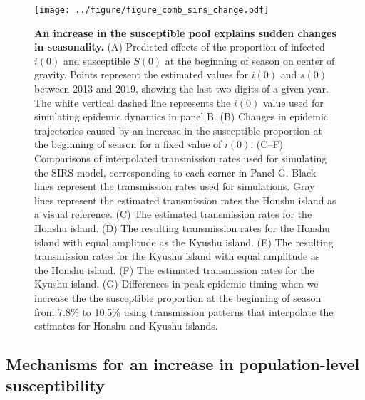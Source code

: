 \documentclass[12pt]{article}
\begin{document}
\begin{figure}[!th]
\begin{center}
\texttt{[image: ../figure/figure\_comb\_sirs\_change.pdf]}
\caption{
\textbf{An increase in the susceptible pool explains sudden changes in seasonality.}
(A) Predicted effects of the proportion of infected $i(0)$ and susceptible $S(0)$ at the beginning of season on center of gravity.
Points represent the estimated values for $i(0)$ and $s(0)$ between 2013 and 2019, showing the last two digits of a given year.
The white vertical dashed line represents the $i(0)$ value used for simulating epidemic dynamics in panel B.
(B) Changes in epidemic trajectories caused by an increase in the susceptible proportion at the beginning of season for a fixed value of $i(0)$.
(C--F) Comparisons of interpolated transmission rates used for simulating the SIRS model, corresponding to each corner in Panel G. 
Black lines represent the transmission rates used for simulations. 
Gray lines represent the estimated transmission rates the Honshu island as a visual reference.
(C) The estimated transmission rates for the Honshu island.
(D) The resulting transmission rates for the Honshu island with equal amplitude as the Kyushu island.
(E) The resulting transmission rates for the Kyushu island with equal amplitude as the Honshu island.
(F) The estimated transmission rates for the Kyushu island.
(G) Differences in peak epidemic timing when we increase the the susceptible proportion at the beginning of season from 7.8\% to 10.5\% using transmission patterns that interpolate the estimates for Honshu and Kyushu islands. 
}
\label{fig:fig3}
\end{center}
\end{figure}

\subsection*{Mechanisms for an increase in population-level susceptibility}
\end{document}
